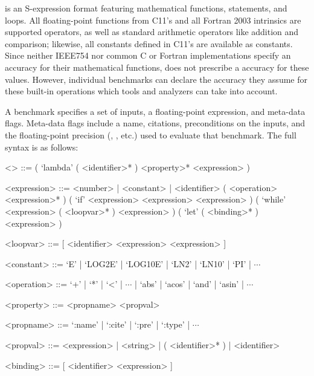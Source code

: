 \documentclass[main.tex]{subfiles}
\begin{document}
\core is an S-expression format featuring
  mathematical functions,  statements, and  loops.
All floating-point functions
  from C11's  and all Fortran 2003 intrinsics
  are supported operators,
  as well as standard arithmetic operators like addition and comparison;
  likewise, all constants defined in C11's  are available as constants.
Since neither IEEE754 nor common C or Fortran implementations specify
  an accuracy for their mathematical functions,
  \core does not prescribe a accuracy for these values.
However, individual benchmarks can declare the accuracy
  they assume for these built-in operations which
  tools and analyzers can take into account.


A \core benchmark specifies a set of inputs,
  a floating-point expression,
  and meta-data flags.
Meta-data flags include a name,
  citations, preconditions on the inputs,
  and the floating-point precision
  (, , etc.)
  used to evaluate that benchmark.
The full \core syntax is as follows:

\begin{grammar}
\small
<\core> ::= ( `lambda' ( <identifier>* ) <property>* <expression> )

<expression> ::= <number> | <constant> | <identifier>
\alt ( <operation> <expression>* )
\alt ( `if' <expression> <expression> <expression> )
\alt ( `while' <expression> ( <loopvar>* ) <expression> )
\alt ( `let' ( <binding>* ) <expression> )

<loopvar> ::= [ <identifier> <expression> <expression> ]

<constant> ::= `E' | `LOG2E' | `LOG10E' | `LN2' | `LN10' | `PI' | $\dotsb$

<operation> ::= `+' | `*' | `<' | $\dotsb$ | `abs' | `acos' | `and' | `asin' | $\dotsb$

<property> ::= <propname> <propval>

<propname> ::= `:name' | `:cite' | `:pre' | `:type' | $\dotsb$

<propval> ::= <expression> | <string> | ( <identifier>* ) | <identifier>

<binding> ::= [ <identifier> <expression> ]
\end{grammar}
\end{document}
